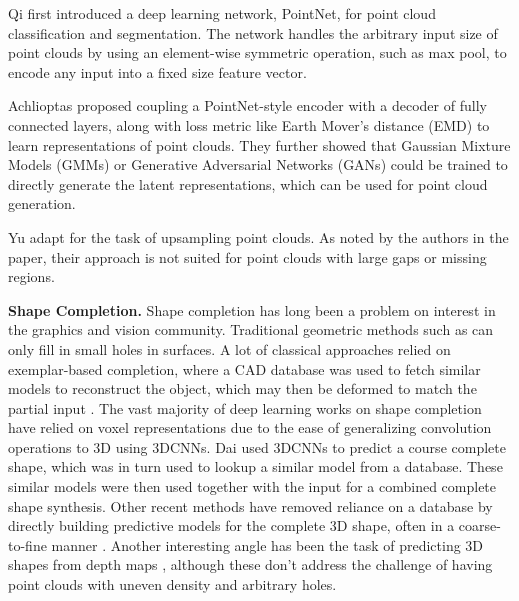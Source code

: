 \documentclass[10pt,twocolumn,letterpaper]{article}
\begin{document}
 Qi \etal \cite{pnet,pnetplus}first introduced a deep learning network, PointNet, for point cloud classification and segmentation. The network handles the arbitrary input size of point clouds by using an element-wise symmetric operation, such as max pool, to encode any input into a fixed size feature vector.

Achlioptas \etal \cite{latentgan} proposed coupling a PointNet-style encoder with a decoder of fully connected layers, along with loss metric like Earth Mover's distance (EMD) to learn representations of point clouds. They further showed that Gaussian Mixture Models (GMMs) or Generative Adversarial Networks (GANs) could be trained to directly generate the latent representations, which can be used for point cloud generation.

Yu \etal \cite{punet} adapt \cite{pnetplus} for the task of upsampling point clouds. As noted by the authors in the paper, their approach is not suited for point clouds with large gaps or missing regions.

\textbf{Shape Completion.} Shape completion has long been a problem on interest in the graphics and vision community. Traditional geometric methods such as \cite{least_mesh,laplacian,poisson} can only fill in small holes in surfaces. A lot of classical approaches relied on exemplar-based completion, where a CAD database was used to fetch similar models to reconstruct the object, which may then be deformed to match the partial input \cite{shape_single_rgbd,data_driven,retrieval}. 
The vast majority of deep learning works on shape completion have relied on voxel representations due to the ease of generalizing convolution operations to 3D using 3DCNNs. Dai \etal \cite{scancomplete} used 3DCNNs to predict a course complete shape, which was in turn used to lookup a similar model from a database. These similar models were then used together with the input for a combined complete shape synthesis. Other recent methods have removed reliance on a database by directly building predictive models for the complete 3D shape, often in a coarse-to-fine manner \cite{scancomplete,robotic,stutz,highresolution}. Another interesting angle has been the task of predicting 3D shapes from depth maps \cite{pixels,depthviews}, although these don't address the challenge of having point clouds with uneven density and arbitrary holes.
\end{document}
